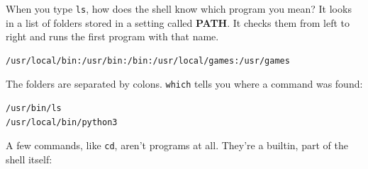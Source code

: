 When you type \texttt{ls}, how does the shell know which program you mean? It looks in a list of folders stored in a setting called \textbf{PATH}. It checks them from left to right and runs the first program with that name.

\begin{codeblock}

\begin{Shaded}
\begin{Highlighting}[]
 
\end{Highlighting}
\end{Shaded}

\end{codeblock}

\begin{codeblock}
\begin{Verbatim}[formatcom=\outputstyle]
/usr/local/bin:/usr/bin:/bin:/usr/local/games:/usr/games
\end{Verbatim}
\end{codeblock}


The folders are separated by colons. \texttt{which} tells you where a command was found:

\begin{codeblock}

\begin{Shaded}
\begin{Highlighting}[]
\end{Highlighting}
\end{Shaded}

\end{codeblock}

\begin{codeblock}
\begin{Verbatim}[formatcom=\outputstyle]
/usr/bin/ls
/usr/local/bin/python3
\end{Verbatim}
\end{codeblock}


A few commands, like \texttt{cd}, aren't programs at all. They're a builtin, part of the shell itself:

\begin{codeblock}

\begin{Shaded}
\begin{Highlighting}[]
\end{Highlighting}
\end{Shaded}

\end{codeblock}

